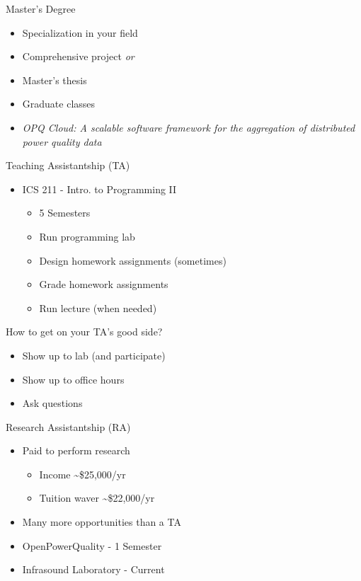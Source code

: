 \documentclass{beamer}
\begin{document}
\begin{frame}{Master's Degree}
	\begin{itemize}
		\item Specialization in your field
		\item Comprehensive project \emph{or}
		\item Master's thesis
		\item Graduate classes
		\item \emph{OPQ Cloud: A scalable software framework for the aggregation of distributed power quality data}
	\end{itemize}
\end{frame}

\begin{frame}{Teaching Assistantship (TA)}
\begin{itemize}
	\item ICS 211 - Intro. to Programming II
	\begin{itemize}
		\item 5 Semesters
		\item Run programming lab
		\item Design homework assignments (sometimes)
		\item Grade homework assignments
		\item Run lecture (when needed)
	\end{itemize}
\end{itemize}
\end{frame}

\begin{frame}{How to get on your TA's good side?}
\begin{itemize}
	\item Show up to lab (and participate)
	\item Show up to office hours
	\item Ask questions
\end{itemize}
\end{frame}

\begin{frame}{Research Assistantship (RA)}
\begin{itemize}
	\item Paid to perform research 
	\begin{itemize}
		\item Income \textasciitilde\$25,000/yr
		\item Tuition waver \textasciitilde\$22,000/yr
	\end{itemize}
	\item Many more opportunities than a TA
	\item OpenPowerQuality - 1 Semester
	\item Infrasound Laboratory - Current
\end{itemize}
\end{frame}
\end{document}
